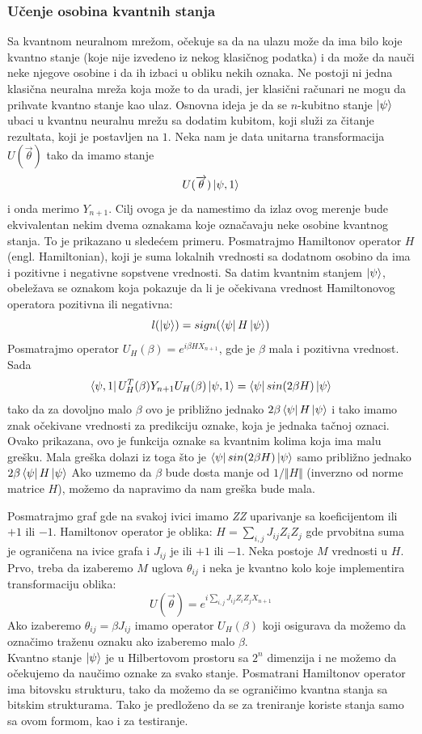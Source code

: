 \documentclass[12pt, letterpaper, oneside]{article}
\begin{document}
\subsubsection{Učenje osobina kvantnih stanja}
Sa kvantnom neuralnom mrežom, očekuje sa da na ulazu može da ima bilo koje kvantno stanje (koje nije izvedeno iz nekog klasičnog podatka)
i da može da nauči neke njegove osobine i da ih izbaci u obliku nekih oznaka. Ne postoji ni jedna klasična neuralna mreža koja može to da uradi, jer klasični računari ne mogu da prihvate kvantno stanje kao ulaz.
Osnovna ideja je da se $n$-kubitno stanje $\Ket{\psi}$ ubaci u kvantnu neuralnu mrežu sa dodatim kubitom, koji služi za čitanje rezultata, koji je postavljen na $1$.
Neka nam je data unitarna transformacija $U(\overrightarrow{\theta})$ tako da imamo stanje
\[
    U(\overrightarrow{\theta})\Ket{\psi,1}
\] 
i onda merimo $Y_{n+1}$. Cilj ovoga je da namestimo da izlaz ovog merenje bude ekvivalentan nekim dvema oznakama koje označavaju neke osobine kvantnog stanja.
To je prikazano u sledećem primeru.
Posmatrajmo Hamiltonov operator $H$ (engl. Hamiltonian), koji je suma lokalnih vrednosti sa dodatnom osobino da ima i pozitivne i negativne sopstvene vrednosti.
Sa datim kvantnim stanjem $\ket{\psi}$, obeležava se oznakom koja pokazuje da li je očekivana vrednost Hamiltonovog operatora pozitivna ili negativna:
\[
    l(\Ket{\psi}) = sign(\bra{\psi}H\Ket{\psi})
\]
Posmatrajmo operator $U_H(\beta) = e^{i\beta HX_{n+1}}$, gde je $\beta$ mala i pozitivna vrednost. Sada
\[
    \Bra{\psi,1}U_H^T(\beta)Y_{n+1}U_H(\beta)\Ket{\psi,1} = \bra{\psi}sin(2\beta H)\Ket{\psi}
\]
tako da za dovoljno malo $\beta$ ovo je približno jednako $2\beta\bra{\psi}H\Ket{\psi}$ i tako imamo znak očekivane vrednosti za 
predikciju oznake, koja je jednaka tačnoj oznaci. Ovako prikazana, ovo je funkcija oznake sa kvantnim kolima koja ima malu grešku.
Mala greška dolazi iz toga što je $\bra{\psi}sin(2\beta H)\Ket{\psi}$ samo približno jednako $2\beta\bra{\psi}H\Ket{\psi}$
Ako uzmemo da $\beta$ bude dosta manje od $1/\Vert H \Vert$ (inverzno od norme matrice $H$), možemo da napravimo da nam greška bude mala.

Posmatrajmo graf gde na svakoj ivici imamo \textit{ZZ} uparivanje sa koeficijentom ili $+1$ ili $-1$.
Hamiltonov operator je oblika: $H = \sum_{i,j}J_{ij}Z_iZ_j$ gde prvobitna suma je ograničena na ivice grafa i $J_{ij}$ je ili $+1$ ili $-1$.
Neka postoje $M$ vrednosti u $H$. Prvo, treba da izaberemo $M$ uglova $\theta_{ij}$ i neka je kvantno kolo koje implementira transformaciju oblika:
\[
    U(\overrightarrow{\theta}) = e^{i\sum_{i,j}J_{ij}Z_iZ_jX_{n+1}}
\]
Ako izaberemo $\theta_{ij}=\beta J_{ij}$ imamo operator $U_H(\beta)$ koji osigurava da možemo da označimo traženu oznaku ako izaberemo malo $\beta$.\\
Kvantno stanje $\Ket{\psi}$ je u Hilbertovom prostoru sa $2^n$ dimenzija i ne možemo da očekujemo da naučimo oznake za svako stanje.
Posmatrani Hamiltonov operator ima bitovsku strukturu, tako da možemo da se ograničimo kvantna stanja sa bitskim strukturama.
Tako je predloženo da se za treniranje koriste stanja samo sa ovom formom, kao i za testiranje.
\newpage
\end{document}
